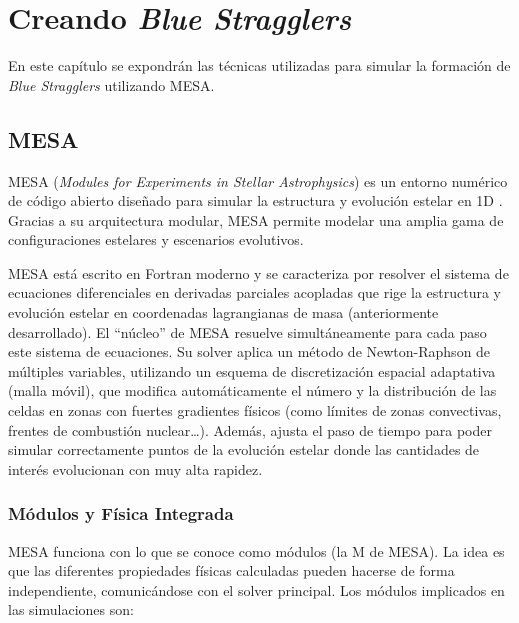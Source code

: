 \chapter{Creando \textit{Blue Stragglers}}

En este capítulo se expondrán las técnicas utilizadas para simular la formación de \textit{Blue Stragglers} utilizando MESA.

\section{MESA}
MESA (\textit{Modules for Experiments in Stellar Astrophysics}) es un entorno numérico de código abierto diseñado para simular la estructura y evolución estelar en 1D \citep{paxton2011, paxton2013, paxton2015, paxton2018, paxton2019, jermyn2023}. Gracias a su arquitectura modular, MESA permite modelar una amplia gama de configuraciones estelares y escenarios evolutivos.

MESA está escrito en Fortran moderno y se caracteriza por resolver el sistema de ecuaciones diferenciales en derivadas parciales acopladas que rige la estructura y evolución estelar en coordenadas lagrangianas de masa (anteriormente desarrollado). El ``núcleo'' de MESA resuelve simultáneamente para cada paso este sistema de ecuaciones. Su solver aplica un método de Newton-Raphson de múltiples variables, utilizando un esquema de discretización espacial adaptativa (malla móvil), que modifica automáticamente el número y la distribución de las celdas en zonas con fuertes gradientes físicos (como límites de zonas convectivas, frentes de combustión nuclear\dots{}). Además, ajusta el paso de tiempo para poder simular correctamente puntos de la evolución estelar donde las cantidades de interés evolucionan con muy alta rapidez.

\subsection{Módulos y Física Integrada}
MESA funciona con lo que se conoce como módulos (la M de MESA). La idea es que las diferentes propiedades físicas calculadas pueden hacerse de forma independiente, comunicándose con el solver principal. Los módulos implicados en las simulaciones son:


